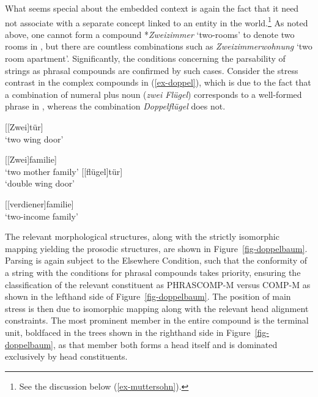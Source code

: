\documentclass[output=paper
 ,nobabel
 ,draftmode
 ,colorlinks, citecolor=brown
]{langscibook}
\begin{document}
\largerpage
What seems special about the embedded context is again the fact that it need not associate with a
separate concept linked to an entity in the world.\footnote{
  See the discussion  below (\ref{ex-muttersohn}).}
As noted above, one cannot form a compound *\emph{Zweizimmer} `two-rooms' to denote two rooms in
, but there are countless combinations such as \emph{Zweizimmerwohnung} `two room
apartment'. Significantly, the conditions concerning the parsability of strings as phrasal compounds
are confirmed by such cases. Consider the stress contrast in the complex compounds in
(\ref{ex-doppel}), which is due to the fact that a combination of numeral plus noun (\eg \emph{zwei
  Flügel}) corresponds to a well-formed phrase in , whereas the combination
\emph{Doppelflügel} does not.  

\begin{multicols}{2}
\eal\label{ex-doppel}
\ex\label{ex-zweiflügeltür}
{[[Zwei]tür]}\\
`two wing door'

\ex\label{ex-zweimütter}
{[[Zwei]familie]}\\
`two mother family'
%
\columnbreak
%
\ex\label{ex-doppelflügeltür}
{[[flügel]tür]}\\
`double wing door'

\ex\label{ex-doppelverdiener}
{[[verdiener]familie]}\\
`two-income family' 
\zl
\end{multicols}

\largerpage
\noindent
The relevant morphological structures, along with the strictly isomorphic mapping yielding the
prosodic structures, are shown in Figure~\ref{fig-doppelbaum}. Parsing is again subject to the
Elsewhere Condition, such that the conformity of a string with the conditions for phrasal compounds
takes priority, ensuring the classification of the relevant constituent as PHRASCOMP-M versus
COMP-M as shown in the lefthand side of Figure~\ref{fig-doppelbaum}.
The position of main stress is then due to isomorphic mapping along with the relevant head alignment
constraints. The most prominent member in the entire compound is the terminal unit, boldfaced
in the trees shown in the righthand side in Figure~\ref{fig-doppelbaum}, as that member both forms a head itself and is dominated exclusively by head constituents.  
\end{document}
